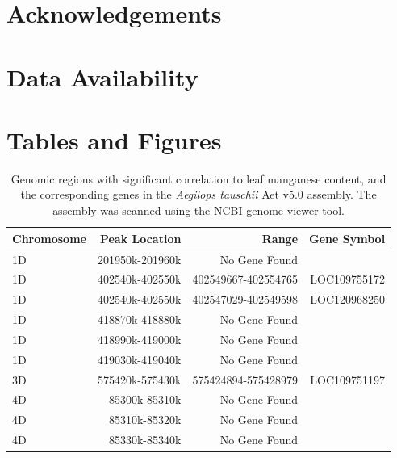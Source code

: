 \documentclass[12pt, letterpaper, ]{report}
\begin{document}
\section{Acknowledgements}

\section{Data Availability}

\printbibliography

\section{Tables and Figures}

\begin{table}[ht]
        \centering
        \caption{Genomic regions with significant correlation to leaf manganese content, and the corresponding genes in the \textit{Aegilops tauschii} Aet v5.0 assembly. The assembly was scanned using the NCBI genome viewer tool.}
        \label{tab:peaks_and_genes}
        \begin{tabular}{lrrr}
        \hline
        \textbf{Chromosome} & \textbf{Peak Location} & \textbf{Range} & \textbf{Gene Symbol} \\
        \hline
        1D         & 201950k-201960k   & No Gene Found          &                 \\
        1D         & 402540k-402550k   & 402549667-402554765    & LOC109755172    \\
        1D         & 402540k-402550k   & 402547029-402549598    & LOC120968250    \\
        1D         & 418870k-418880k   & No Gene Found          &                 \\
        1D         & 418990k-419000k   & No Gene Found          &                 \\
        1D         & 419030k-419040k   & No Gene Found          &                 \\
        3D         & 575420k-575430k   & 575424894-575428979    & LOC109751197    \\
        4D         & 85300k-85310k     & No Gene Found          &                 \\
        4D         & 85310k-85320k     & No Gene Found          &                 \\
        4D         & 85330k-85340k     & No Gene Found          &                 \\
        \hline
        \end{tabular}
\end{table}
        
\end{document}
